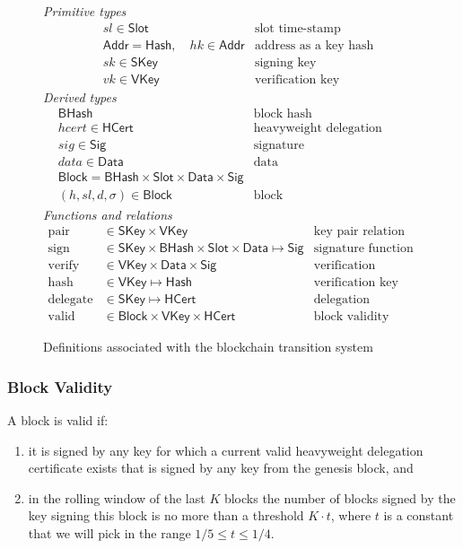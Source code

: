 \documentclass[11pt,a4paper]{article}
\newcommand{\type}[1]{\mathsf{#1}}
\newcommand{\Hash}{\type{Hash}}    %
\newcommand{\BHash}{\type{BHash}}  %
\newcommand{\Addr}{\type{Addr}}
\newcommand{\Slot}{\type{Slot}}
\newcommand{\Block}{\type{Block}}
\newcommand{\HCert}{\type{HCert}}
\newcommand{\SKey}{\type{SKey}}
\newcommand{\VKey}{\type{VKey}}
\newcommand{\Sig}{\type{Sig}}
\newcommand{\Data}{\type{Data}}
\newcommand{\hashname}{hash}
\newcommand{\signname}{sign}
\newcommand{\verifyname}{verify}
\newcommand{\delegatename}{delegate}
\newcommand{\validname}{valid}
\newcommand{\keypairname}{pair}
\begin{document}
\begin{figure}[h]
  \emph{Primitive types}
  \begin{align*}
    & sl \in \Slot & \text{slot time-stamp}\\
    & \Addr = \Hash,\quad hk \in \Addr & \text{address as a key hash}\\
    & sk \in \SKey & \text{signing key}\\
    & vk \in \VKey & \text{verification key}
  \end{align*}
  \emph{Derived types}
  \begin{align*}
    & \BHash & \text{block hash}\\
    & hcert \in \HCert & \text{heavyweight delegation certificate}\\
    & sig \in \Sig  & \text{signature}\\
    & data \in \Data  & \text{data}\\
    & \Block = \BHash \times \Slot \times \Data \times \Sig & \\
    & (h, sl, d, \sigma) \in \Block
      & \text{block}
  \end{align*}
  \emph{Functions and relations}
  \begin{align*}
    \text{\keypairname} & \in \SKey \times \VKey & \text{key pair relation}\\
    \text{\signname} & \in \SKey \times \BHash \times \Slot \times \Data \mapsto \Sig
      & \text{signature function}\\
    \text{\verifyname} & \in \VKey \times \Data \times \Sig
      & \text{verification relation}\\
    \text{\hashname} & \in \VKey \mapsto \Hash
      & \text{verification key hash function}\\
    \text{\delegatename} & \in \SKey \mapsto \HCert
      & \text{delegation function}\\
    \text{\validname} & \in \Block \times \VKey \times \HCert
      & \text{block validity relation}
  \end{align*}
  \caption{Definitions associated with the blockchain transition system}
  \label{fig:state-trans-abstract}
\end{figure}

\subsubsection{Block Validity}
\label{sec:block-valid}
A block is valid if:
\begin{enumerate}
\item it is signed by any key for which a current valid heavyweight delegation
  certificate exists that is signed by any key from the genesis block, and
\item in the rolling window of the last $K$ blocks the number of blocks signed
  by the key signing this block is no more than a threshold $K \cdot t$, where
  $t$ is a constant that we will pick in the range $1/5 \leq t \leq 1/4$.
\end{enumerate}
\end{document}
